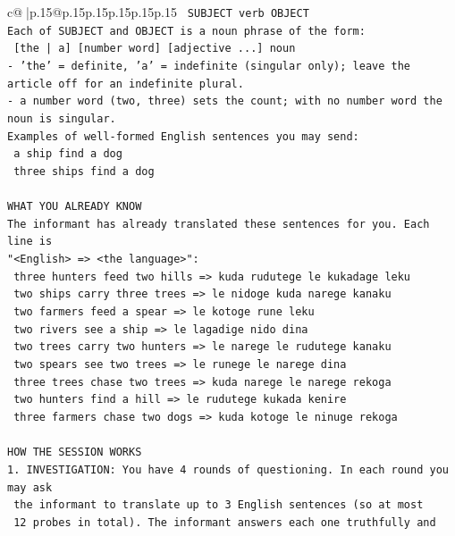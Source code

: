\documentclass{article}
\begin{document}
{\begin{supertabular}{c@{$\;$}|p{.15\linewidth}@{}p{.15\linewidth}p{.15\linewidth}p{.15\linewidth}p{.15\linewidth}p{.15\linewidth}}
{{{\texttt{    SUBJECT  verb  OBJECT} \\
\texttt{Each of SUBJECT and OBJECT is a noun phrase of the form:} \\
\texttt{    {[}the | a{]}  {[}number word{]}  {[}adjective ...{]}  noun} \\
\texttt{{-} 'the' = definite, 'a' = indefinite (singular only); leave the article off for an indefinite plural.} \\
\texttt{{-} a number word (two, three) sets the count; with no number word the noun is singular.} \\
\texttt{Examples of well{-}formed English sentences you may send:} \\
\texttt{    a ship find a dog} \\
\texttt{    three ships find a dog} \\
\\ 
\texttt{WHAT YOU ALREADY KNOW} \\
\texttt{The informant has already translated these sentences for you. Each line is} \\
\texttt{"<English>  =>  <the language>":} \\
\texttt{    three hunters feed two hills  =>  kuda rudutege le kukadage leku} \\
\texttt{    two ships carry three trees  =>  le nidoge kuda narege kanaku} \\
\texttt{    two farmers feed a spear  =>  le kotoge rune leku} \\
\texttt{    two rivers see a ship  =>  le lagadige nido dina} \\
\texttt{    two trees carry two hunters  =>  le narege le rudutege kanaku} \\
\texttt{    two spears see two trees  =>  le runege le narege dina} \\
\texttt{    three trees chase two trees  =>  kuda narege le narege rekoga} \\
\texttt{    two hunters find a hill  =>  le rudutege kukada kenire} \\
\texttt{    three farmers chase two dogs  =>  kuda kotoge le ninuge rekoga} \\
\\ 
\texttt{HOW THE SESSION WORKS} \\
\texttt{1. INVESTIGATION: You have 4 rounds of questioning. In each round you may ask} \\
\texttt{   the informant to translate up to 3 English sentences (so at most} \\
\texttt{   12 probes in total). The informant answers each one truthfully and} \\
}}}
\end{supertabular}}
\end{document}
